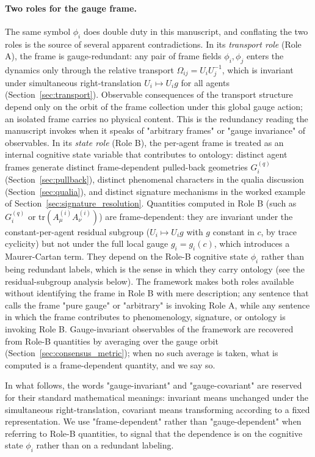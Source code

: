 \documentclass[11pt]{article}
\begin{document}
\paragraph{Two roles for the gauge frame.} The same symbol $\phi_i$ does double duty in this manuscript, and conflating the two roles is the source of several apparent contradictions. In its \emph{transport role} (Role A), the frame is gauge-redundant: any pair of frame fields $\phi_i, \phi_j$ enters the dynamics only through the relative transport $\Omega_{ij} = U_iU_j^{-1}$, which is invariant under simultaneous right-translation $U_i \mapsto U_i g$ for all agents (Section~\ref{sec:transport}). Observable consequences of the transport structure depend only on the orbit of the frame collection under this global gauge action; an isolated frame carries no physical content. This is the redundancy reading the manuscript invokes when it speaks of "arbitrary frames" or "gauge invariance" of observables. In its \emph{state role} (Role B), the per-agent frame is treated as an internal cognitive state variable that contributes to ontology: distinct agent frames generate distinct frame-dependent pulled-back geometries $G_i^{(q)}$ (Section~\ref{sec:pullback}), distinct phenomenal characters in the qualia discussion (Section~\ref{sec:qualia}), and distinct signature mechanisms in the worked example of Section~\ref{sec:signature_resolution}. Quantities computed in Role B (such as $G_i^{(q)}$ or $\mathrm{tr}(A^{(i)}_\mu A^{(i)}_\nu)$) are frame-dependent: they are invariant under the constant-per-agent residual subgroup ($U_i \mapsto U_i g$ with $g$ constant in $c$, by trace cyclicity) but not under the full local gauge $g_i = g_i(c)$, which introduces a Maurer-Cartan term. They depend on the Role-B cognitive state $\phi_i$ rather than being redundant labels, which is the sense in which they carry ontology (see the residual-subgroup analysis below). The framework makes both roles available without identifying the frame in Role B with mere description; any sentence that calls the frame "pure gauge" or "arbitrary" is invoking Role A, while any sentence in which the frame contributes to phenomenology, signature, or ontology is invoking Role B. Gauge-invariant observables of the framework are recovered from Role-B quantities by averaging over the gauge orbit (Section~\ref{sec:consensus_metric}); when no such average is taken, what is computed is a frame-dependent quantity, and we say so.

In what follows, the words "gauge-invariant" and "gauge-covariant" are reserved for their standard mathematical meanings: invariant means unchanged under the simultaneous right-translation, covariant means transforming according to a fixed representation. We use "frame-dependent" rather than "gauge-dependent" when referring to Role-B quantities, to signal that the dependence is on the cognitive state $\phi_i$ rather than on a redundant labeling.
\end{document}
